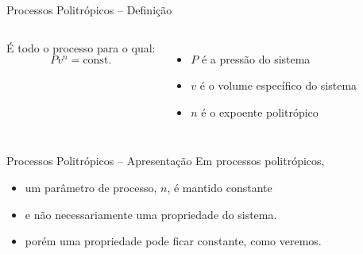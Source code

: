     \begin{frame}{Processos Politrópicos -- Definição}\vspace*{-2em}
        \begin{columns}
        É todo o processo para o qual:
        $$Pv^n = \mbox{const.}$$
         \\[\bigskipamount]
        \begin{itemize}
            \item<2-> $P$ é a pressão do sistema \\[\bigskipamount]
            \item<3-> $v$ é o volume específico do sistema \\[\bigskipamount]
            \item<4-> $n$ é o \alert{expoente politrópico}
        \end{itemize}
        \end{columns}
    \end{frame}

    \begin{frame}{Processos Politrópicos -- Apresentação}\vspace*{-2em}
        Em processos politrópicos, \\[\medskipamount]
        \begin{itemize}
            \item<1-> um \alert{parâmetro} de processo, \alert{$n$}, é mantido constante
                \\[\medskipamount]
            \item<2-> e não \alert{necessariamente} uma \alert{propriedade} do sistema.
                \\[\medskipamount]
            \item<3-> porém uma propriedade \alert{pode} ficar constante, como veremos.
                \\[\bigskipamount]
        \end{itemize}
    \end{frame}

